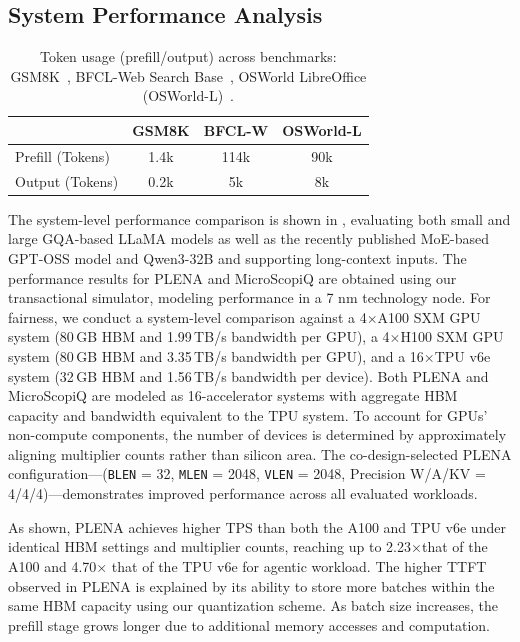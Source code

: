 \subsection{System Performance Analysis}

\begin{table}[t]
\centering
\caption{Token usage (prefill/output) across benchmarks:
GSM8K~\cite{gsm8k},
BFCL-Web Search Base~\cite{bfcl},
OSWorld LibreOffice (OSWorld-L)~\cite{osworld}.}
\label{tab:benchmark_token_usage}
\setlength{\tabcolsep}{3pt}
\renewcommand{\arraystretch}{0.9}
\small
\begin{tabular}{lccc}
\toprule
 & GSM8K & BFCL-W & OSWorld-L  \\
\midrule
Prefill (Tokens) & 1.4k & 114k & 90k  \\
Output (Tokens) & 0.2k & 5k   & 8k  \\
\bottomrule
\end{tabular}
\vspace{-10pt}
\end{table}

The system-level performance comparison is shown in , evaluating both small and large GQA-based LLaMA models as well as the recently published MoE-based GPT-OSS model and Qwen3-32B and supporting long-context inputs. The performance results for PLENA and MicroScopiQ are obtained using our transactional simulator, modeling performance in a 7 nm technology node. For fairness, we conduct a system-level comparison against a 4$\times$A100 SXM GPU system (80\,GB HBM and 1.99\,TB/s bandwidth per GPU), a 4$\times$H100 SXM GPU system (80\,GB HBM and 3.35\,TB/s bandwidth per GPU), and a 16$\times$TPU v6e system (32\,GB HBM and 1.56\,TB/s bandwidth per device). Both PLENA and MicroScopiQ are modeled as 16-accelerator systems with aggregate HBM capacity and bandwidth equivalent to the TPU system. To account for GPUs' non-compute components, the number of devices is determined by approximately aligning multiplier counts rather than silicon area. The co-design-selected PLENA configuration—(\texttt{BLEN} = 32, \texttt{MLEN} = 2048, \texttt{VLEN} = 2048, Precision W/A/KV = 4/4/4)—demonstrates improved performance across all evaluated workloads.

As shown, PLENA achieves higher TPS than both the A100 and TPU v6e under identical HBM settings and multiplier counts, reaching up to 2.23$\times$that of the A100 and 4.70$\times$ that of the TPU v6e for agentic workload. The higher TTFT observed in PLENA is explained by its ability to store more batches within the same HBM capacity using our quantization scheme. As batch size increases, the prefill stage grows longer due to additional memory accesses and computation.
